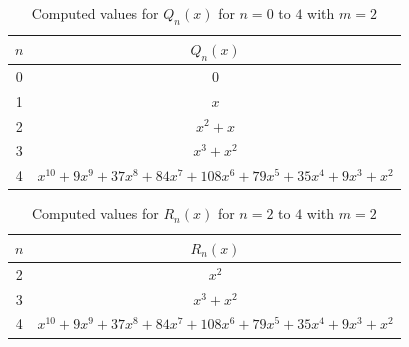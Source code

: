 \documentclass{amsart}
\theoremstyle{definition}
\begin{document}
\begin{appendix}
\begin{table}[h]
    \centering
    \begin{tabular}{c|c}
        \hline
        $n$ & $Q_n(x)$ \\
        \hline
        0 & $0$ \\
        1 & $x$ \\
        2 & $x^2 + x$ \\
        3 & $x^3 + x^2$ \\
        4 & $x^{10} + 9x^9 + 37x^8 + 84x^7 + 108x^6 + 79x^5 + 35x^4 + 9x^3 + x^2$ \\
        \hline
    \end{tabular}
    \caption{Computed values for $Q_n(x)$ for $n=0$ to $4$ with $m=2$}
    \label{tab:values_Q}
\end{table}

\begin{table}[h]
    \centering
    \begin{tabular}{c|c}
        \hline
        $n$ & $R_n(x)$ \\
        \hline
        2 & $x^2$ \\
        3 & $x^3 + x^2$ \\
        4 & $x^{10} + 9x^9 + 37x^8 + 84x^7 + 108x^6 + 79x^5 + 35x^4 + 9x^3 + x^2$ \\
        \hline
    \end{tabular}
    \caption{Computed values for $R_n(x)$ for $n=2$ to $4$ with $m=2$}
    \label{tab:values_R}
\end{table}

\end{appendix}

\newpage





\end{document}
